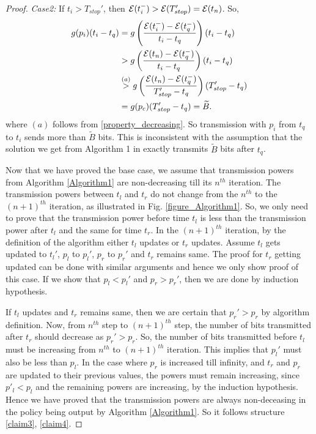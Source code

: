 \begin{proof}
\textit{Case2:} If $t_i>T_{stop}'$, then $\mathcal{E}(t_i^-)>\mathcal{E}(T_{stop}')=\mathcal{E}(t_n)$. So, 
\begin{align}
g(p_i)(t_i-t_q)&=g\left(\frac{\ETx(t_i^-)-\ETx(t_q^-)}{t_i-t_q}\right)(t_i-t_q)
\\
&>g\left(\frac{\ETx(t_n)-\ETx(t_q^-)}{t_i-t_q}\right)(t_i-t_q)
\\
&\stackrel{(a)}{>}g\left(\frac{\ETx(t_n)-\ETx(t_q^-)}{T_{stop}'-t_q}\right)(T_{stop}'-t_q)\label{eq_2_algo1_modified}
\\
&=g(p_c)(T_{stop}'-t_q)=\widetilde{B}.
\end{align}
where %
$(a)$ follows from \eqref{property_decreasing}. So transmission with $p_i$ from $t_q$ to $t_i$ sends more than $\widetilde{B}$ bits. This is inconsistent with the assumption that the solution we get from Algorithm 1 in \cite{Yang} exactly transmits $\widetilde{B}$ bits after $t_q$. 

Now that we have proved the base case, we assume that transmission powers from Algorithm \ref{Algorithm1} are non-decreasing till its $n^{th}$ iteration. The transmission powers between $t_l$ and $t_r$ do not change from the $n^{th}$ to the $(n+1)^{th}$ iteration, as illustrated in Fig. \ref{figure_Algorithm1}. So, we only need to prove that the transmission power before time $t_l$ is less than the transmission power after $t_l$ and the same for time $t_r$. In the $(n+1)^{th}$ iteration, by the definition of the algorithm either $t_l$ updates or $t_{r}$ updates. Assume $t_l$ gets updated to $t_{l}'$, $p_l$ to $p_l'$, $p_r$ to $p_r'$ and $t_r$ remains same. The proof for $t_r$ getting updated can be done with similar arguments and hence we only show proof of this case. If we show that $p_l<p_l'$ and $p_r>p_r'$, then we are done by induction hypothesis.

If $t_l$ updates and $t_r$ remains same, then we are certain that $p_{r}'>p_r$ by algorithm definition. Now, from $n^{th}$ step to $(n+1)^{th}$ step, the number of bits transmitted after $t_r$ should decrease as $p_{r}'>p_r$. So, the number of bits transmitted before $t_l$ must be increasing from $n^{th}$ to $(n+1)^{th}$ iteration. This implies that $p_l'$ must also be less than $p_l$. In the case where $p_r$ is increased till infinity, and $t_r$ and $p_r$ are updated to their previous values, the powers must remain increasing, since $p'_l <p_l$ and the remaining powers are increasing, by the induction hypothesis. Hence we have proved that the transmission powers are always non-deceasing in the policy being output by Algorithm \ref{Algorithm1}. So it follows structure \eqref{claim3}, \eqref{claim4}.


\end{proof}
